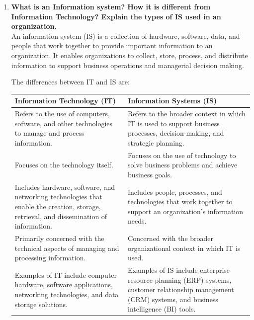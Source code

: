 \documentclass[12pt]{article}
\begin{document}
\begin{enumerate}
    \item {\bfseries What is an Information system? How it is different from Information Technology?
    Explain the types of IS used in an organization.\\}
    An information system (IS) is a collection of hardware, software, data, and people that work together to provide important information to an organization. 
    It enables organizations to collect, store, process, and distribute information to support business operations and managerial decision making. 
   
    The differences between IT and IS are: 
    \begin{table}[h!]
        \centering
        \begin{tabular}{|L{6cm}|L{6cm}|}
            \hline
            \textbf{Information Technology (IT)} & \textbf{Information Systems (IS)} \\
            \hline
            Refers to the use of computers, software, and other technologies to manage and process information. & Refers to the broader context in which IT is used to support business processes, decision-making, and strategic planning. \\
            \hline
            Focuses on the technology itself. & Focuses on the use of technology to solve business problems and achieve business goals. \\
            \hline
            Includes hardware, software, and networking technologies that enable the creation, storage, retrieval, and dissemination of information. & Includes people, processes, and technologies that work together to support an organization's information needs. \\
            \hline
            Primarily concerned with the technical aspects of managing and processing information. & Concerned with the broader organizational context in which IT is used. \\
            \hline
            Examples of IT include computer hardware, software applications, networking technologies, and data storage solutions. & Examples of IS include enterprise resource planning (ERP) systems, customer relationship management (CRM) systems, and business intelligence (BI) tools. \\
            \hline
            \end{tabular}
    \end{table}
   

\end{enumerate}
\end{document}
